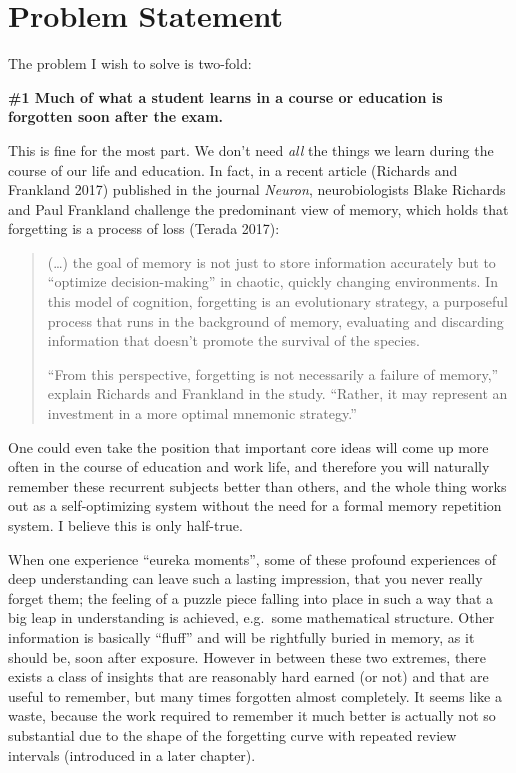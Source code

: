 \section{Problem Statement}\label{problem-statement}

The problem I wish to solve is two-fold:

\textbf{\#1 Much of what a student learns in a course or education is
forgotten soon after the exam.}

This is fine for the most part. We don't need \emph{all} the things we
learn during the course of our life and education. In fact, in a recent
article (Richards and Frankland 2017) published in the journal
\emph{Neuron}, neurobiologists Blake Richards and Paul Frankland
challenge the predominant view of memory, which holds that forgetting is
a process of loss (Terada 2017):

\begin{quote}
(\ldots{}) the goal of memory is not just to store information
accurately but to ``optimize decision-making'' in chaotic, quickly
changing environments. In this model of cognition, forgetting is an
evolutionary strategy, a purposeful process that runs in the background
of memory, evaluating and discarding information that doesn't promote
the survival of the species.

``From this perspective, forgetting is not necessarily a failure of
memory,'' explain Richards and Frankland in the study. ``Rather, it may
represent an investment in a more optimal mnemonic strategy.''
\end{quote}

One could even take the position that important core ideas will come up
more often in the course of education and work life, and therefore you
will naturally remember these recurrent subjects better than others, and
the whole thing works out as a self-optimizing system without the need
for a formal memory repetition system. I believe this is only half-true.

When one experience ``eureka moments'', some of these profound
experiences of deep understanding can leave such a lasting impression,
that you never really forget them; the feeling of a puzzle piece falling
into place in such a way that a big leap in understanding is achieved,
e.g.~some mathematical structure. Other information is basically
``fluff'' and will be rightfully buried in memory, as it should be, soon
after exposure. However in between these two extremes, there exists a
class of insights that are reasonably hard earned (or not) and that are
useful to remember, but many times forgotten almost completely. It seems
like a waste, because the work required to remember it much better is
actually not so substantial due to the shape of the forgetting curve
with repeated review intervals (introduced in a later chapter).

